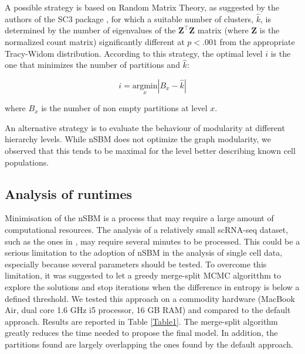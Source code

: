 \documentclass[10pt]{article}
\begin{document}
A possible strategy is based on Random Matrix Theory, as suggested by the authors of the SC3 package  \cite{kiselev_2017}, for which a suitable number of clusters, $\hat{k}$, is determined by the number of eigenvalues of the $\boldsymbol Z^\top\boldsymbol Z$ matrix (where $\boldsymbol Z$ is the normalized count matrix) significantly different at $p<.001$ from the appropriate Tracy-Widom distribution. According to this strategy, the optimal level $i$ is the one that minimizes the number of partitions and $\hat{k}$:

\begin{equation}
i = \underset{x}{\mathrm{argmin}} |B_x - \hat{k}|
\label{Equation_RMT}
\end{equation}

where $B_x$ is the number of non empty partitions at level $x$.

An alternative strategy is to evaluate the behaviour of modularity at different hierarchy levels. While nSBM does not optimize the graph modularity, we observed that this tends to be maximal for the level better describing known cell populations. 




\subsection*{Analysis of runtimes}

Minimisation of the nSBM is a process that may require a large amount of computational resources. The analysis of a relatively small scRNA-seq dataset, such as the ones in \cite{mereu_2020}, may require several minutes to be processed. This could be a serious limitation to the adoption of nSBM in the analysis of single cell data, especially because several parameters should be tested. To overcome this limitation, it was suggested to let a greedy merge-split MCMC algoritthm \cite{peixoto_2020} to explore the solutions and stop iterations when the difference in entropy is below a defined threshold. We tested this approach on a commodity hardware (MacBook Air, dual core 1.6 GHz i5 processor, 16 GB RAM) and compared to the default approach. Results are reported in Table \ref{Table1}. The merge-split algorithm greatly reduces the time needed to propose the final model. In addition, the partitions found are largely overlapping the ones found by the default approach. 
\end{document}
